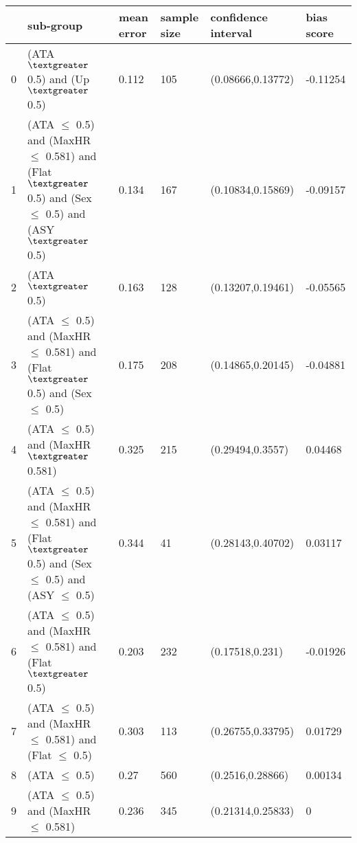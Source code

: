 \begin{tabular}{llllll}
\toprule
{} &                                                                             sub-group & mean error & sample size & confidence interval & bias score \\
\midrule
0 &                                                            (ATA $\textgreater$ 0.5) and (Up $\textgreater$ 0.5) &      0.112 &         105 &   (0.08666,0.13772) &   -0.11254 \\
1 &   (ATA $\leq$ 0.5) and (MaxHR $\leq$ 0.581) and (Flat $\textgreater$ 0.5) and (Sex $\leq$ 0.5) and (ASY $\textgreater$ 0.5) &      0.134 &         167 &   (0.10834,0.15869) &   -0.09157 \\
2 &                                                                           (ATA $\textgreater$ 0.5) &      0.163 &         128 &   (0.13207,0.19461) &   -0.05565 \\
3 &                   (ATA $\leq$ 0.5) and (MaxHR $\leq$ 0.581) and (Flat $\textgreater$ 0.5) and (Sex $\leq$ 0.5) &      0.175 &         208 &   (0.14865,0.20145) &   -0.04881 \\
4 &                                                      (ATA $\leq$ 0.5) and (MaxHR $\textgreater$ 0.581) &      0.325 &         215 &    (0.29494,0.3557) &    0.04468 \\
5 &  (ATA $\leq$ 0.5) and (MaxHR $\leq$ 0.581) and (Flat $\textgreater$ 0.5) and (Sex $\leq$ 0.5) and (ASY $\leq$ 0.5) &      0.344 &          41 &   (0.28143,0.40702) &    0.03117 \\
6 &                                    (ATA $\leq$ 0.5) and (MaxHR $\leq$ 0.581) and (Flat $\textgreater$ 0.5) &      0.203 &         232 &     (0.17518,0.231) &   -0.01926 \\
7 &                                   (ATA $\leq$ 0.5) and (MaxHR $\leq$ 0.581) and (Flat $\leq$ 0.5) &      0.303 &         113 &   (0.26755,0.33795) &    0.01729 \\
8 &                                                                          (ATA $\leq$ 0.5) &       0.27 &         560 &    (0.2516,0.28866) &    0.00134 \\
9 &                                                     (ATA $\leq$ 0.5) and (MaxHR $\leq$ 0.581) &      0.236 &         345 &   (0.21314,0.25833) &          0 \\
\bottomrule
\end{tabular}
